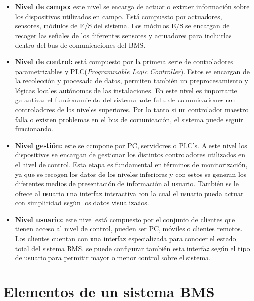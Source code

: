 \begin{itemize}
    \item \textbf{Nivel de campo:} 
    este nivel se encarga de actuar o extraer información sobre los dispositivos utilizados en campo. Está compuesto por actuadores, sensores, módulos de E/S del sistema. Los módulos E/S se encargan de recoger las señales de los diferentes sensores y actuadores para incluirlas dentro del bus de comunicaciones del BMS.
    \item \textbf{Nivel de control:}
     está compuesto por la primera serie de controladores parametrizables y PLC(\textit{Programmable Logic Controller}). Estos se encargan de la recolección y procesado de datos, permiten también un preprocesamiento y lógicas locales autónomas de las instalaciones. En este nivel es importante garantizar el funcionamiento del sistema ante falla de comunicaciones con controladores de los niveles superiores. Por lo tanto si un controlador maestro falla o existen problemas en el bus de comunicación, el sistema puede seguir funcionando.
     \item \textbf{Nivel gestión:}
     este se compone por PC, servidores o PLC's. A este nivel los dispositivos se encargan de gestionar los distintos controladores utilizados en el nivel de control. Esta etapa es fundamental en términos de monitorización, ya que se recogen los datos de los niveles inferiores y con estos se generan los diferentes medios de presentación de información al usuario. También se le ofrece al usuario una interfaz interactiva con la cual el usuario pueda actuar con simplicidad según los datos visualizados.
     \item \textbf{Nivel usuario:}
     este nivel está compuesto por el conjunto de clientes que tienen acceso al nivel de control, pueden ser PC, móviles o clientes remotos. Los clientes cuentan con una interfaz especializada para conocer el estado total del sistema BMS, se puede configurar también esta interfaz según el tipo de usuario para permitir mayor o menor control sobre el sistema. 
\end{itemize}

\section{Elementos de un sistema BMS}

